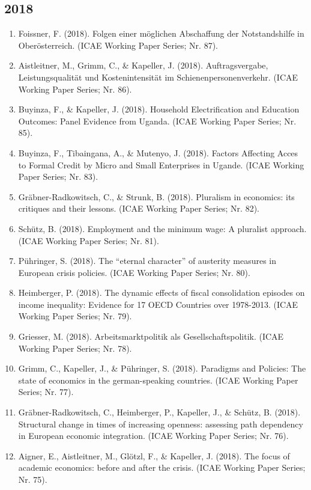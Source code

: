 \subsection*{2018}
\begin{enumerate}
	 \item Foissner, F. (2018). Folgen einer möglichen Abschaffung der Notstandshilfe in Oberösterreich. (ICAE Working Paper Series; Nr. 87).
	 \item Aistleitner, M., Grimm, C., \& Kapeller, J. (2018). Auftragsvergabe, Leistungsqualität und Kostenintensität im Schienenpersonenverkehr. (ICAE Working Paper Series; Nr. 86).
	 \item Buyinza, F., \& Kapeller, J. (2018). Household Electrification and Education Outcomes: Panel Evidence from Uganda. (ICAE Working Paper Series; Nr. 85).
	 \item Buyinza, F., Tibaingana, A., \& Mutenyo, J. (2018). Factors Affecting Acces to Formal Credit by Micro and Small Enterprises in Ugande. (ICAE Working Paper Series; Nr. 83).
	 \item Gräbner-Radkowitsch, C., \& Strunk, B. (2018). Pluralism in economics: its critiques and their lessons. (ICAE Working Paper Series; Nr. 82).
	 \item Schütz, B. (2018). Employment and the minimum wage: A pluralist approach. (ICAE Working Paper Series; Nr. 81).
	 \item Pühringer, S. (2018). The “eternal character” of austerity measures in European crisis policies. (ICAE Working Paper Series; Nr. 80).
	 \item Heimberger, P. (2018). The dynamic effects of fiscal consolidation episodes on income inequality: Evidence for 17 OECD Countries over 1978-2013. (ICAE Working Paper Series; Nr. 79).
	 \item Griesser, M. (2018). Arbeitsmarktpolitik als Gesellschaftspolitik. (ICAE Working Paper Series; Nr. 78).
	 \item Grimm, C., Kapeller, J., \& Pühringer, S. (2018). Paradigms and Policies: The state of economics in the german-speaking countries. (ICAE Working Paper Series; Nr. 77).
	 \item Gräbner-Radkowitsch, C., Heimberger, P., Kapeller, J., \& Schütz, B. (2018). Structural change in times of increasing openness: assessing path dependency in European economic integration. (ICAE Working Paper Series; Nr. 76).
	 \item Aigner, E., Aistleitner, M., Glötzl, F., \& Kapeller, J. (2018). The focus of academic economics: before and after the crisis. (ICAE Working Paper Series; Nr. 75).
\end{enumerate}
